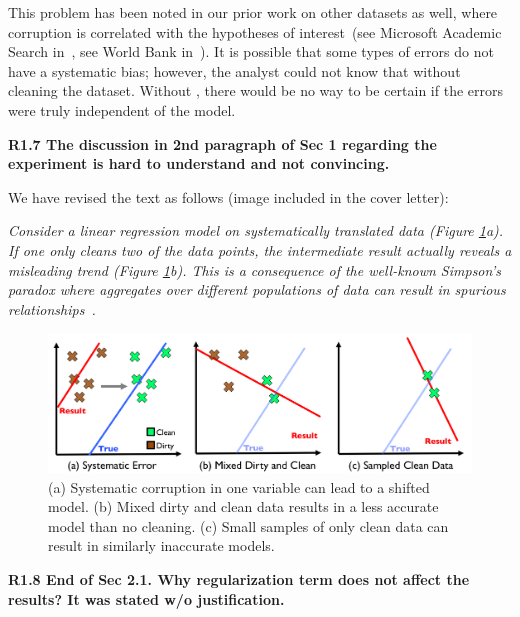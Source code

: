 This problem has been noted in our prior work on other datasets as well, where corruption is correlated with the hypotheses of interest~(see Microsoft Academic Search in~\cite{wang1999sample}, see World Bank in~\cite{activecleanarxiv}). It is possible that some types of errors do not have a systematic bias; however, the analyst could not know that without cleaning the dataset.
Without \sys, there would be no way to be certain if the errors were truly independent of the model.

\vspace{0.5em}

\noindent\textbf{R1.7 The discussion in 2nd paragraph of Sec 1 regarding the experiment is hard to understand and not convincing.}

\noindent We have revised the text as follows (image included in the cover letter):

\emph{Consider a linear regression model on systematically translated data (Figure \ref{update-arch-coverletter}a).
If one only cleans two of the data points, the intermediate result actually reveals a misleading trend (Figure \ref{update-arch-coverletter}b).
This is a consequence of the well-known Simpson's paradox where aggregates over different populations of data can result in spurious relationships~\cite{simpson1951interpretation}.}

\begin{figure}[ht!]
\centering
 \includegraphics[width=\columnwidth]{figs/update-arch.png}
 \caption{(a) Systematic corruption in one variable can lead to a shifted model. 
 (b) Mixed dirty and clean data results in a less accurate model than no cleaning.
(c) Small samples of only clean data can result in similarly inaccurate models. \label{update-arch-coverletter}}
\end{figure}

\vspace{0.5em}

\noindent\textbf{R1.8 End of Sec 2.1. Why regularization term does not affect the results? It was stated w/o justification.}

